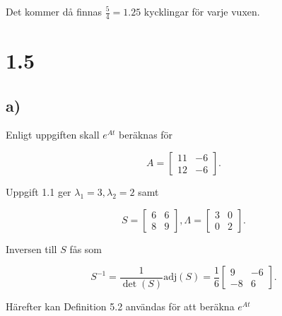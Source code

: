 \documentclass[a4paper]{article}
\newcommand{\mat}[1]{\bm{\mathit{#1}}}
\begin{document}
\noindent Det kommer då finnas $\frac 54 = 1.25$ kycklingar för varje vuxen.

\section*{1.5}
\subsection*{a)}

Enligt uppgiften skall $e^{\mat{A}t}$ beräknas för

\begin{equation*}
  \mat{A} = \begin{bmatrix} 11 & -6\\ 12 & -6\end{bmatrix}.
\end{equation*}

\noindent Uppgift 1.1 ger $\lambda_1 = 3, \lambda_2 = 2$ samt

\begin{equation*}
  \mat{S} = \begin{bmatrix}6 & 6\\8 & 9\end{bmatrix}, \Lambda = \begin{bmatrix}3 & 0\\0 & 2\end{bmatrix}.
\end{equation*}

\noindent Inversen till $\mat{S}$ fås som

\begin{equation*}
  \mat{S}^{-1} = \frac{1}{\det(\mat{S})}\text{adj}(\mat{S}) = \frac 16 \begin{bmatrix}9 & -6\\-8 & 6\end{bmatrix}.
\end{equation*}

\noindent Härefter kan Definition 5.2 användas för att beräkna $e^{\mat{A}t}$
\end{document}
